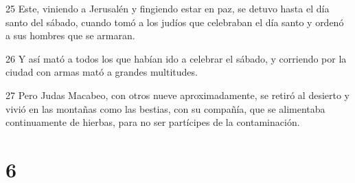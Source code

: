 \par 25 Este, viniendo a Jerusalén y fingiendo estar en paz, se detuvo hasta el día santo del sábado, cuando tomó a los judíos que celebraban el día santo y ordenó a sus hombres que se armaran.
\par 26 Y así mató a todos los que habían ido a celebrar el sábado, y corriendo por la ciudad con armas mató a grandes multitudes.
\par 27 Pero Judas Macabeo, con otros nueve aproximadamente, se retiró al desierto y vivió en las montañas como las bestias, con su compañía, que se alimentaba continuamente de hierbas, para no ser partícipes de la contaminación.

\chapter{6}

